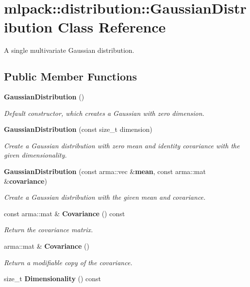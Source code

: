 \section{mlpack\-:\-:distribution\-:\-:Gaussian\-Distribution Class Reference}
\label{classmlpack_1_1distribution_1_1GaussianDistribution}


A single multivariate Gaussian distribution.  


\subsection*{Public Member Functions}
\begin{DoxyCompactItemize}
\item 
{\bf Gaussian\-Distribution} ()
\begin{DoxyCompactList}\small\item\em Default constructor, which creates a Gaussian with zero dimension. \end{DoxyCompactList}\item 
{\bf Gaussian\-Distribution} (const size\-\_\-t dimension)
\begin{DoxyCompactList}\small\item\em Create a Gaussian distribution with zero mean and identity covariance with the given dimensionality. \end{DoxyCompactList}\item 
{\bf Gaussian\-Distribution} (const arma\-::vec \&{\bf mean}, const arma\-::mat \&{\bf covariance})
\begin{DoxyCompactList}\small\item\em Create a Gaussian distribution with the given mean and covariance. \end{DoxyCompactList}\item 
const arma\-::mat \& {\bf Covariance} () const 
\begin{DoxyCompactList}\small\item\em Return the covariance matrix. \end{DoxyCompactList}\item 
arma\-::mat \& {\bf Covariance} ()
\begin{DoxyCompactList}\small\item\em Return a modifiable copy of the covariance. \end{DoxyCompactList}\item 
size\-\_\-t {\bf Dimensionality} () const 

\end{DoxyCompactItemize}
